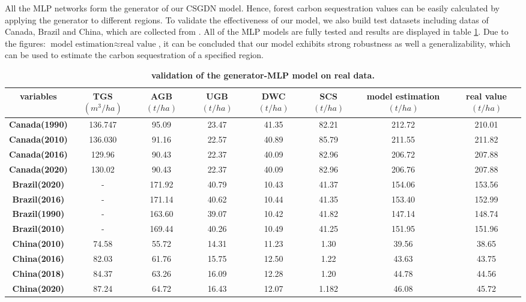 \documentclass[12pt]{article}
\begin{document}
All the MLP networks form the generator of our CSGDN model. Hence, forest carbon sequestration values can be easily calculated by applying the generator to different regions. To validate the effectiveness of our model, we also build test datasets including datas of Canada, Brazil and China, which are collected from \cite{1}. All of the MLP models are fully tested and results are displayed in table \ref{us}. Due to the figures: $\text{model estimation}\approx\text{real value}$, it can be concluded that our model exhibits strong robustness as well a generalizability, which can be used to estimate the carbon sequestration of a specified region.

\begin{table}[h]
	\centering
	\setlength{\tabcolsep}{2pt}
	\begin{adjustwidth}{-0.135\textwidth}{}
	\begin{tabular}{cccccccc}
		\toprule[2pt]
		\textbf{variables} & \textbf{TGS}$(m^3/ha)$ & \textbf{AGB}$(t/ha)$ & \textbf{UGB}$(t/ha)$ & \textbf{DWC}$(t/ha)$ & \textbf{SCS}$(t/ha)$ & \textbf{model estimation}$(t/ha)$ & \textbf{real value}$(t/ha)$ \\
		\midrule[1pt]
		\textbf{Canada(1990)} & 136.747 & 95.09 & 23.47 & 41.35 & 82.21 & 212.72 & 210.01 \\
		\textbf{Canada(2010)} & 136.030 & 91.16 & 22.57 & 40.89 & 85.79 &211.55 & 211.82 \\
		\textbf{Canada(2016)} & 129.96 & 90.43 & 22.37 & 40.09 & 82.96 &206.72 & 207.88 \\
		\textbf{Canada(2020)} & 130.02 & 90.43 & 22.37 & 40.09 & 82.96 &206.76 & 207.88 \\
		\textbf{Brazil(2020)} & - & 171.92 & 40.79 & 10.43 & 41.37 &154.06 & 153.56 \\ 
		\textbf{Brazil(2016)} & - & 171.14 & 40.62 & 10.44 & 41.35 &153.40 & 152.99 \\
		\textbf{Brazil(1990)} & - & 163.60 & 39.07 & 10.42 & 41.82 &147.14 & 148.74 \\
		\textbf{Brazil(2010)} & - & 169.44 & 40.26 & 10.49 & 41.25 &151.95 & 151.96 \\
		\textbf{China(2010)} & 74.58 & 55.72 & 14.31 & 11.23 & 1.30 &39.56 & 38.65 \\
		\textbf{China(2016)} & 82.03 & 61.76 & 15.75 & 12.50 & 1.22 &43.63 & 43.75 \\
		\textbf{China(2018)} & 84.37 & 63.26 & 16.09 & 12.28 & 1.20 &44.78 & 44.56 \\
		\textbf{China(2020)} & 87.24 & 64.72 & 16.43 & 12.07 & 1.182 &46.08 & 45.72 \\
		\bottomrule[2pt]
	\end{tabular}
	\end{adjustwidth}
	\label{us}
	\caption{\textbf{validation of the generator-MLP model on real data.}}
\end{table}  
\end{document}
